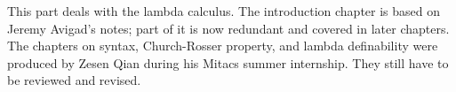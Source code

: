 \documentclass[../../include/open-logic-part]{subfiles}
\begin{document}

\begin{editorial}
This part deals with the lambda calculus. The introduction chapter is
based on Jeremy Avigad's notes; part of it is now redundant and covered in
later chapters. The chapters on syntax, Church-Rosser property, and
lambda definability were produced by Zesen Qian during his Mitacs summer
internship. They still have to be reviewed and revised.
\end{editorial}





\OLEndPartHook
\end{document}
